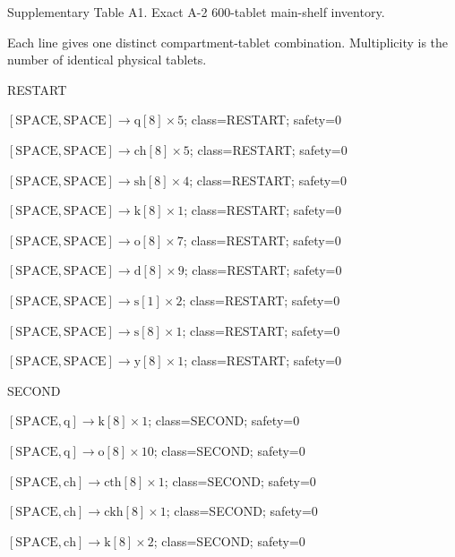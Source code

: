 Supplementary Table A1. Exact A-2 600-tablet main-shelf inventory.\par
Each line gives one distinct compartment-tablet combination. Multiplicity is the number of identical physical tablets.\par
\par
RESTART\par
\(\left[\mathrm{SPACE}, \mathrm{SPACE}\right] \to \mathrm{q}[8] \times 5\); class=RESTART; safety=0\par
\(\left[\mathrm{SPACE}, \mathrm{SPACE}\right] \to \mathrm{ch}[8] \times 5\); class=RESTART; safety=0\par
\(\left[\mathrm{SPACE}, \mathrm{SPACE}\right] \to \mathrm{sh}[8] \times 4\); class=RESTART; safety=0\par
\(\left[\mathrm{SPACE}, \mathrm{SPACE}\right] \to \mathrm{k}[8] \times 1\); class=RESTART; safety=0\par
\(\left[\mathrm{SPACE}, \mathrm{SPACE}\right] \to \mathrm{o}[8] \times 7\); class=RESTART; safety=0\par
\(\left[\mathrm{SPACE}, \mathrm{SPACE}\right] \to \mathrm{d}[8] \times 9\); class=RESTART; safety=0\par
\(\left[\mathrm{SPACE}, \mathrm{SPACE}\right] \to \mathrm{s}[1] \times 2\); class=RESTART; safety=0\par
\(\left[\mathrm{SPACE}, \mathrm{SPACE}\right] \to \mathrm{s}[8] \times 1\); class=RESTART; safety=0\par
\(\left[\mathrm{SPACE}, \mathrm{SPACE}\right] \to \mathrm{y}[8] \times 1\); class=RESTART; safety=0\par
SECOND\par
\(\left[\mathrm{SPACE}, \mathrm{q}\right] \to \mathrm{k}[8] \times 1\); class=SECOND; safety=0\par
\(\left[\mathrm{SPACE}, \mathrm{q}\right] \to \mathrm{o}[8] \times 10\); class=SECOND; safety=0\par
\(\left[\mathrm{SPACE}, \mathrm{ch}\right] \to \mathrm{cth}[8] \times 1\); class=SECOND; safety=0\par
\(\left[\mathrm{SPACE}, \mathrm{ch}\right] \to \mathrm{ckh}[8] \times 1\); class=SECOND; safety=0\par
\(\left[\mathrm{SPACE}, \mathrm{ch}\right] \to \mathrm{k}[8] \times 2\); class=SECOND; safety=0\par
